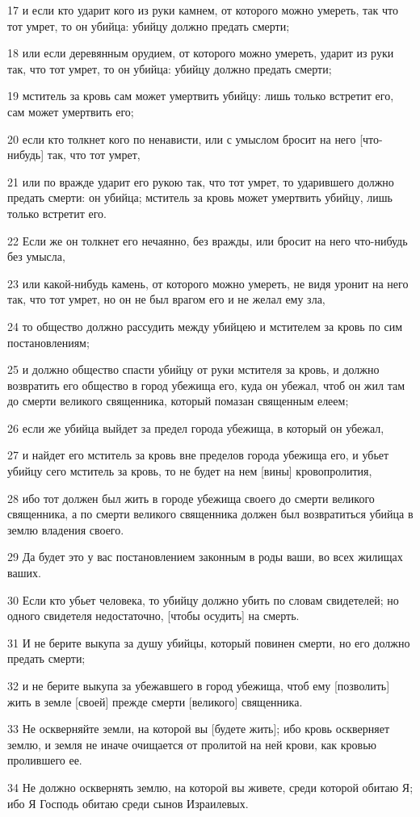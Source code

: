 \par 17 и если кто ударит кого из руки камнем, от которого можно умереть, так что тот умрет, то он убийца: убийцу должно предать смерти;
\par 18 или если деревянным орудием, от которого можно умереть, ударит из руки так, что тот умрет, то он убийца: убийцу должно предать смерти;
\par 19 мститель за кровь сам может умертвить убийцу: лишь только встретит его, сам может умертвить его;
\par 20 если кто толкнет кого по ненависти, или с умыслом бросит на него [что-нибудь] так, что тот умрет,
\par 21 или по вражде ударит его рукою так, что тот умрет, то ударившего должно предать смерти: он убийца; мститель за кровь может умертвить убийцу, лишь только встретит его.
\par 22 Если же он толкнет его нечаянно, без вражды, или бросит на него что-нибудь без умысла,
\par 23 или какой-нибудь камень, от которого можно умереть, не видя уронит на него так, что тот умрет, но он не был врагом его и не желал ему зла,
\par 24 то общество должно рассудить между убийцею и мстителем за кровь по сим постановлениям;
\par 25 и должно общество спасти убийцу от руки мстителя за кровь, и должно возвратить его общество в город убежища его, куда он убежал, чтоб он жил там до смерти великого священника, который помазан священным елеем;
\par 26 если же убийца выйдет за предел города убежища, в который он убежал,
\par 27 и найдет его мститель за кровь вне пределов города убежища его, и убьет убийцу сего мститель за кровь, то не будет на нем [вины] кровопролития,
\par 28 ибо тот должен был жить в городе убежища своего до смерти великого священника, а по смерти великого священника должен был возвратиться убийца в землю владения своего.
\par 29 Да будет это у вас постановлением законным в роды ваши, во всех жилищах ваших.
\par 30 Если кто убьет человека, то убийцу должно убить по словам свидетелей; но одного свидетеля недостаточно, [чтобы осудить] на смерть.
\par 31 И не берите выкупа за душу убийцы, который повинен смерти, но его должно предать смерти;
\par 32 и не берите выкупа за убежавшего в город убежища, чтоб ему [позволить] жить в земле [своей] прежде смерти [великого] священника.
\par 33 Не оскверняйте земли, на которой вы [будете жить]; ибо кровь оскверняет землю, и земля не иначе очищается от пролитой на ней крови, как кровью пролившего ее.
\par 34 Не должно осквернять землю, на которой вы живете, среди которой обитаю Я; ибо Я Господь обитаю среди сынов Израилевых.

